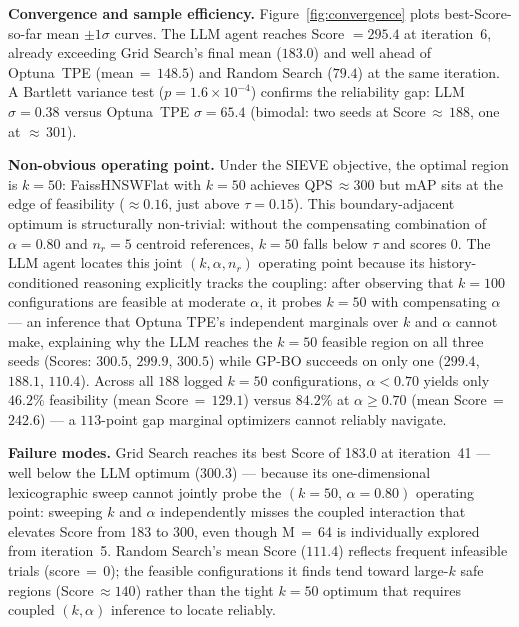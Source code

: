 \documentclass[sigconf, nonacm]{acmart}
\theoremstyle{definition}
\begin{document}
\noindent\textbf{Convergence and sample efficiency.}
Figure~\ref{fig:convergence} plots best-Score-so-far mean $\pm 1\sigma$ curves.
The LLM agent reaches Score $= 295.4$ at iteration~6, already exceeding Grid
Search's final mean ($183.0$) and well ahead of Optuna~TPE
(mean\,$=$\,$148.5$) and Random Search ($79.4$) at the same iteration.
A Bartlett variance test ($p{=}1.6{\times}10^{-4}$) confirms the reliability gap:
LLM $\sigma{=}0.38$ versus Optuna~TPE $\sigma{=}65.4$ (bimodal: two seeds at
Score\,${\approx}\,188$, one at ${\approx}\,301$).

\noindent\textbf{Non-obvious operating point.}
Under the SIEVE objective, the optimal region is $k{=}50$: FaissHNSWFlat
with $k{=}50$ achieves QPS\,$\approx\!300$ but mAP sits at the edge of
feasibility ($\approx\!0.16$, just above $\tau{=}0.15$).
This boundary-adjacent optimum is structurally non-trivial: without the
compensating combination of $\alpha{=}0.80$ and $n_r{=}5$ centroid
references, $k{=}50$ falls below $\tau$ and scores $0$.
The LLM agent locates this joint $(k,\alpha,n_r)$ operating point because
its history-conditioned reasoning explicitly tracks the coupling: after
observing that $k{=}100$ configurations are feasible at moderate $\alpha$,
it probes $k{=}50$ with compensating $\alpha$ --- an inference that Optuna
TPE's independent marginals over $k$ and $\alpha$ cannot make, explaining
why the LLM reaches the $k{=}50$ feasible region on all three seeds
(Scores: $300.5$, $299.9$, $300.5$) while GP-BO succeeds on only one
($299.4$, $188.1$, $110.4$).
Across all $188$ logged $k{=}50$ configurations, $\alpha{<}0.70$ yields only $46.2\%$ feasibility (mean Score\,$=$\,$129.1$) versus $84.2\%$ at $\alpha{\geq}0.70$ (mean Score\,$=$\,$242.6$) --- a $113$-point gap marginal optimizers cannot reliably navigate.

\noindent\textbf{Failure modes.}
Grid Search reaches its best Score of 183.0 at iteration~41 --- well below the
LLM optimum (300.3) --- because its one-dimensional lexicographic sweep cannot
jointly probe the $(k{=}50,\,\alpha{=}0.80)$ operating point: sweeping $k$ and
$\alpha$ independently misses the coupled interaction that elevates Score from
183 to 300, even though M\,$=$\,64 is individually explored from iteration~5.
Random Search's mean Score ($111.4$) reflects frequent infeasible trials
(score\,$=$\,$0$); the feasible configurations it finds tend toward large-$k$
safe regions (Score\,$\approx\!140$) rather than the tight $k{=}50$ optimum
that requires coupled $(k,\alpha)$ inference to locate reliably.
\end{document}
